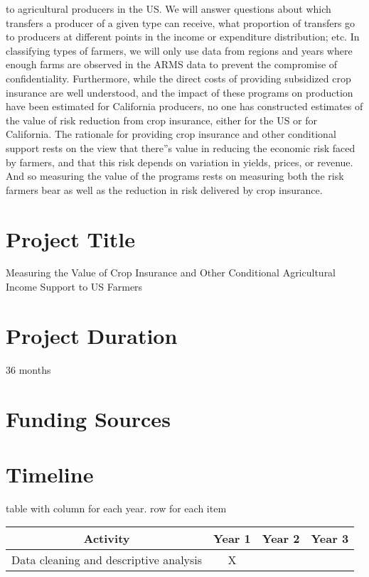 \documentclass{article}
\begin{document}
to agricultural producers in the US. We will answer questions about which transfers
a producer of a given type can receive, what proportion of transfers go to producers
at different points in the income or expenditure distribution; etc. In classifying types
of farmers, we will only use data from regions and years where enough farms are
observed in the ARMS data to prevent the compromise of confidentiality.
Furthermore, while the direct costs of providing subsidized crop insurance are well
understood, and the impact of these programs on production have been estimated for
California producers, no one has constructed estimates of the value of risk reduction
from crop insurance, either for the US or for California. The rationale for providing
crop insurance and other conditional support rests on the view that there''s value in
reducing the economic risk faced by farmers, and that this risk depends on variation
in yields, prices, or revenue. And so measuring the value of the programs rests on
measuring both the risk farmers bear as well as the reduction in risk delivered by
crop insurance.

\section*{Project Title} 
Measuring the Value of Crop Insurance and Other Conditional Agricultural Income Support to US Farmers

\section*{Project Duration} 
36 months

\section*{Funding Sources} 


\section*{Timeline} 
table with column for each year. row for each item 

\begin{table}
    \begin{tabular}{c|c|c|c}
        \toprule 
        Activity                                &   Year 1  &   Year 2  &   Year 3  \\
        \midrule 
        Data cleaning and descriptive analysis  &   X       &           &           \\ 


    \end{tabular}
\end{table}
\end{document}
